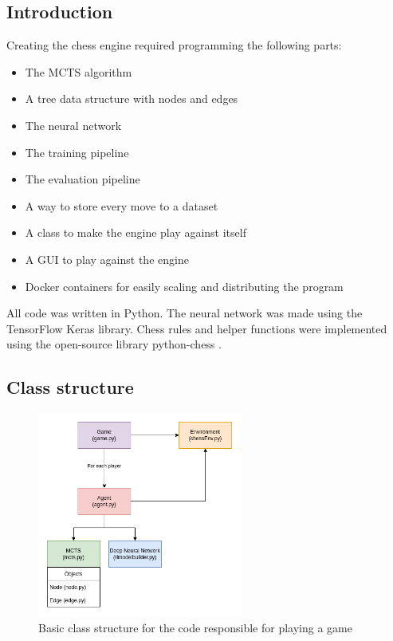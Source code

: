 \documentclass{article}
\begin{document}
\subsection{Introduction}

Creating the chess engine required programming the following parts:

\begin{itemize}
    \item The MCTS algorithm
    \item A tree data structure with nodes and edges
    \item The neural network
    \item The training pipeline
    \item The evaluation pipeline
    \item A way to store every move to a dataset
    \item A class to make the engine play against itself
    \item A GUI to play against the engine
    \item Docker containers for easily scaling and distributing the program
\end{itemize}

All code was written in Python. The neural network was made using the TensorFlow Keras library.
Chess rules and helper functions were implemented using the open-source library python-chess \cite{PythonchessChessLibrarya}.

\subsection{Class structure}

\begin{figure}[H]
    \centering
    \includegraphics[width=0.6\textwidth]{img/class-structure.png}
    \caption{Basic class structure for the code responsible for playing a game}
\end{figure}
\end{document}
